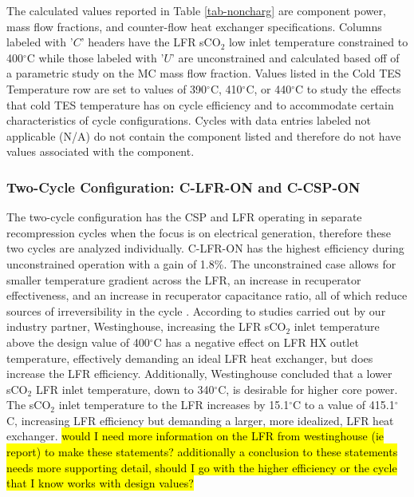 \begin{paracol}{2}
\linenumbers
\switchcolumn

The calculated values reported in Table \ref{tab-noncharg} are component power, mass flow fractions, and counter-flow heat exchanger specifications. Columns labeled with '$C$' headers have the LFR sCO$_2$ low inlet temperature constrained to 400$^{\circ}$C while those labeled with '$U$' are unconstrained and calculated based off of a parametric study on the MC mass flow fraction. Values listed in the Cold TES Temperature row are set to values of 390$^{\circ}$C, 410$^{\circ}$C, or 440$^{\circ}$C to study the effects that cold TES temperature has on cycle efficiency and to accommodate certain characteristics of cycle configurations. Cycles with data entries labeled not applicable (N/A) do not contain the component listed and therefore do not have values associated with the component. 

\subsubsection{Two-Cycle Configuration: C-LFR-ON and C-CSP-ON}

The two-cycle configuration has the CSP and LFR operating in separate recompression cycles when the focus is on electrical generation, therefore these two cycles are analyzed individually. C-LFR-ON has the highest efficiency during unconstrained operation with a gain of 1.8\%. The unconstrained case allows for smaller temperature gradient across the LFR, an increase in recuperator effectiveness, and an increase in recuperator capacitance ratio, all of which reduce sources of irreversibility in the cycle \cite{klein_nellis_2011}. According to studies carried out by our industry partner, Westinghouse, increasing the LFR sCO$_2$ inlet temperature above the design value of 400$^{\circ}$C has a negative effect on LFR HX outlet temperature, effectively demanding an ideal LFR heat exchanger, but does increase the LFR efficiency. Additionally, Westinghouse concluded that a lower sCO$_2$ LFR inlet temperature, down to 340$^{\circ}$C, is desirable for higher core power. The sCO$_2$ inlet temperature to the LFR increases by 15.1$^{\circ}$C to a value of 415.1$^{\circ}$C, increasing LFR efficiency but demanding a larger, more idealized, LFR heat exchanger.   
\hl{would I need more information on the LFR from westinghouse (ie report) to make these statements? additionally a conclusion to these statements needs more supporting detail, should I go with the higher efficiency or the cycle that I know works with design values?}


\end{paracol}
